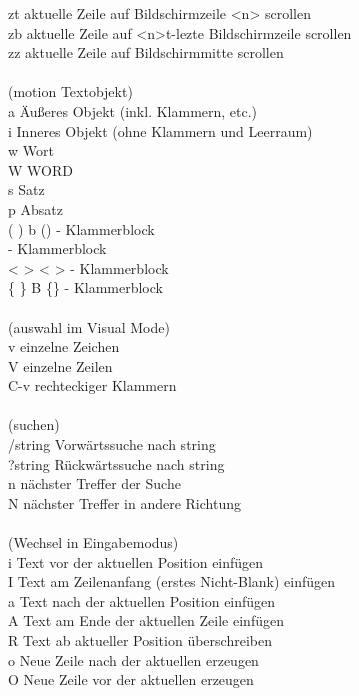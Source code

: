 \documentclass[10pt,a4paper,twoside]{book}
\begin{document}
\begin{tabbing}
\> [<n>]zt \>		aktuelle Zeile auf Bildschirmzeile <n> scrollen\\
\> [<n>]zb	\> 	aktuelle Zeile auf <n>t-lezte Bildschirmzeile scrollen\\
\> zz	\>	aktuelle Zeile auf Bildschirmmitte scrollen\\
\\
(motion Textobjekt)\\
\> a \> 	Äußeres Objekt (inkl. Klammern, etc.)\\
\> i	 \> 	Inneres Objekt (ohne Klammern und Leerraum)\\
\> w \> 	Wort\\
\> W \> 	WORD\\
\> s \> 	Satz\\
\> p \> 	Absatz\\
\> ( ) b \> 		() - Klammerblock\\
\> [ ]	\> 	[] - Klammerblock\\
\> < > \> < > - Klammerblock\\
\> \{ \} B	\> 	\{\} - Klammerblock\\
\\
(auswahl im Visual Mode)\\
\> v \> einzelne Zeichen\\
\> V \> einzelne Zeilen\\
\> C-v \> rechteckiger Klammern\\
\\
(suchen)\\
\> /string \> Vorwärtssuche nach string\\
\> ?string \> Rückwärtssuche nach string\\
\> n \> nächster Treffer der Suche\\
\> N \> nächster Treffer in andere Richtung\\
\\
(Wechsel in Eingabemodus)\\
\> i	 \>	Text vor der aktuellen Position einfügen\\
\> I	 \>	Text am Zeilenanfang (erstes Nicht-Blank) einfügen\\
\> a	 \>	Text nach der aktuellen Position einfügen\\
\> A	 \>	Text am Ende der aktuellen Zeile einfügen\\
\> R	 \>	Text ab aktueller Position überschreiben\\
\> o	 \>	Neue Zeile nach der aktuellen erzeugen\\
\> O	 \>	Neue Zeile vor der aktuellen erzeugen\\

\end{tabbing}
\end{document}
